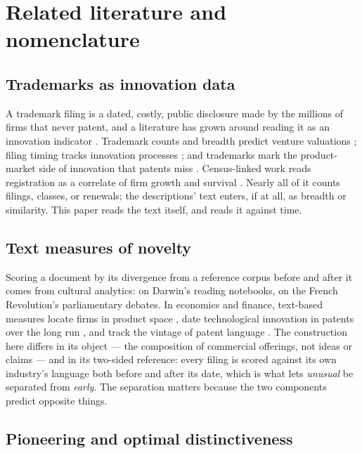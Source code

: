 \section{Related literature and nomenclature}\label{sec:related}

\subsection{Trademarks as innovation data}

A trademark filing is a dated, costly, public disclosure made by the
millions of firms that never patent, and a literature has grown around
reading it as an innovation indicator \citep{Castaldi2020, Willeke2026}.
Trademark counts and breadth predict venture valuations
\citep{Block2014}; filing timing tracks innovation processes
\citep{Seip2018}; and trademarks mark the product-market side of
innovation that patents miss \citep{Flikkema2019, Flikkema2025}.
Census-linked work reads registration as a correlate of firm growth and
survival \citep{Dinlersoz2018, Dinlersoz2023}. Nearly all of it counts
filings, classes, or renewals; the descriptions' text enters, if at all,
as breadth or similarity. This paper reads the text itself, and reads it
against time.

\subsection{Text measures of novelty}

Scoring a document by its divergence from a reference corpus before and
after it comes from cultural analytics: \citet{Murdock2017} on Darwin's
reading notebooks, \citet{Barron2018} on the French Revolution's
parliamentary debates. In economics and finance, text-based measures
locate firms in product space \citep{HobergPhillips2016}, date
technological innovation in patents over the long run \citep{Kelly2021},
and track the vintage of patent language \citep{Kalyani2024}. The
construction here differs in its object --- the composition of commercial
offerings, not ideas or claims --- and in its two-sided reference: every
filing is scored against its own industry's language both before and
after its date, which is what lets \emph{unusual} be separated from
\emph{early}. The separation matters because the two components predict
opposite things.

\subsection{Pioneering and optimal distinctiveness}

